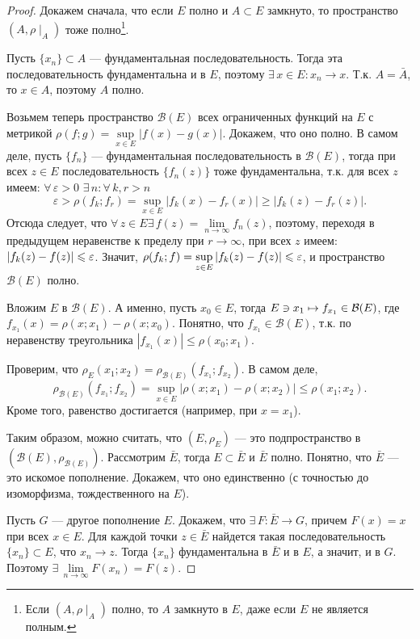 \documentclass[10pt]{article}
\newcommand*{\p}[1]{#1\nobreak\discretionary{}{\hbox{$\mathsurround=0pt #1$}}{}}
\begin{document}
\begin{proof}
Докажем сначала, что если $E$ полно и $A\subset E$ замкнуто, то
пространство $(A,\rho\mid_A)$ тоже полно\footnote{Если
$(A,\rho\mid_A)$ полно, то $A$ замкнуто в $E$, даже если $E$ не
является полным.}.

Пусть $\{x_n\}\subset A$ --- фундаментальная последовательность.
Тогда эта последовательность фундаментальна и в $E$, поэтому
$\exists\, x\in E:x_n\to x$. Т.к. $A=\bar{A}$, то $x\in A$, поэтому
$A$ полно.

Возьмем теперь пространство $\mathcal{B}(E)$ всех ограниченных
функций на $E$ с метрикой $\rho(f;g)=\sup\limits_{x\in
E}|f(x)-g(x)|$. Докажем, что оно полно. В самом деле, пусть
$\{f_n\}$ --- фундаментальная последовательность в $\mathcal{B}(E)$,
тогда при всех $z\in E$ последовательность $\{f_n(z)\}$ тоже
фундаментальна, т.к. для всех $z$ имеем: $\forall\,\varepsilon>0$\;
$\exists\,n:\forall\,k,r>n$
$$\varepsilon>\rho(f_k;f_r)=\sup\limits_{x\in
E}|f_k(x)-f_r(x)|\geqslant|f_k(z)-f_r(z)|.$$ Отсюда следует, что
$\forall\,z\in E$\;\;$\exists\,f(z)=\lim\limits_{n\to\infty}f_n(z)$,
поэтому, переходя в предыдущем неравенстве к пределу при
$r\to\infty$, при всех $z$ имеем:
$|f_k(z)\p-f(z)|\leqslant\varepsilon$. Значит,
$\rho(f_k;f)\p=\sup\limits_{z\in
E}|f_k(z)-f(z)|\leqslant\varepsilon$, и пространство
$\mathcal{B}(E)$ полно.

Вложим $E$ в $\mathcal{B}(E)$. А именно, пусть $x_0\in E$, тогда
$E\ni x_1\mapsto f_{x_1}\p\in\mathcal{B}(E)$, где
$f_{x_1}(x)=\rho(x;x_1)-\rho(x;x_0)$. Понятно, что
$f_{x_1}\in\mathcal{B}(E)$, т.к. по неравенству треугольника
$|f_{x_1}(x)|\leqslant\rho(x_0;x_1)$.

Проверим, что
$\rho_E(x_1;x_2)=\rho_{\mathcal{B}(E)}(f_{x_1};f_{x_2})$. В самом
деле, $$\rho_{\mathcal{B}(E)}(f_{x_1};f_{x_2})=\sup\limits_{x\in
E}|\rho(x;x_1)-\rho(x;x_2)|\leqslant\rho(x_1;x_2).$$ Кроме того,
равенство достигается (например, при $x=x_1$).

Таким образом, можно считать, что $(E,\rho_E)$ --- это
подпространство в $(\mathcal{B}(E), \rho_{\mathcal{B}(E)})$.
Рассмотрим $\bar{E}$, тогда $E\subset \bar{E}$ и $\bar{E}$ полно.
Понятно, что $\bar{E}$
--- это искомое пополнение. Докажем, что оно единственно (с точностью
до изоморфизма, тождественного на $E$).

Пусть $G$ --- другое пополнение $E$. Докажем, что $\exists\, F\colon
\bar{E}\to G$, причем $F(x)=x$ при всех $x\in E$. Для каждой точки
$z\in\bar{E}$ найдется такая последовательность $\{x_n\}\subset E$,
что $x_n\to z$. Тогда $\{x_n\}$ фундаментальна в $\bar{E}$ и в $E$,
а значит, и в $G$. Поэтому
$\exists\,\lim\limits_{n\to\infty}F(x_n)=F(z)$.


\end{proof}
\end{document}
